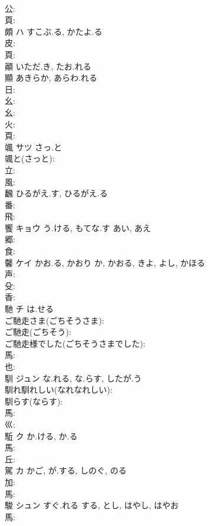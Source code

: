 \documentclass[8pt]{extreport}
\begin{document}
\begin{CJK}{UTF8}{min}
\\	公: 
\\	頁: 
\\	頗	ハ	すこぶ.る, かたよ.る		
\\	皮: 
\\	頁: 
\\	顚		いただ.き, たお.れる				
\\	顯		あきらか, あらわ.れる				
\\	日: 
\\	幺: 
\\	幺: 
\\	火: 
\\	頁: 
\\	颯	サツ	さっ.と		
\\	颯と(さっと): 
\\	立: 
\\	風: 
\\	飜		ひるがえ.す, ひるがえ.る				
\\	番: 
\\	飛: 
\\	饗	キョウ	う.ける, もてな.す	あい, あえ	
\\	郷: 
\\	食: 
\\	馨	ケイ	かお.る, かおり	か, かおる, きよ, よし, かほる	
\\	声: 
\\	殳: 
\\	香: 
\\	馳	チ	は.せる		
\\	ご馳走さま(ごちそうさま): 
\\	ご馳走(ごちそう): 
\\	ご馳走様でした(ごちそうさまでした): 
\\	馬: 
\\	也: 
\\	馴	ジュン	な.れる, な.らす, したが.う		
\\	馴れ馴れしい(なれなれしい): 
\\	馴らす(ならす): 
\\	馬: 
\\	巛: 
\\	駈	ク	か.ける, か.る		
\\	馬: 
\\	丘: 
\\	駕	カ	かご, が.する, しのぐ, のる		
\\	加: 
\\	馬: 
\\	駿	シュン	すぐ.れる	する, とし, はやし, はやお	
\\	馬: 

\end{CJK}
\end{document}
